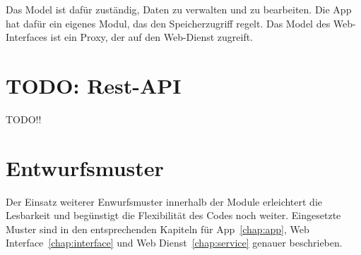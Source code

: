 Das Model ist dafür zuständig, Daten zu verwalten und zu bearbeiten. Die App hat dafür ein eigenes Modul, das den Speicherzugriff regelt. Das Model des Web-Interfaces ist ein Proxy, der auf den Web-Dienst zugreift.\newline\par

\section{TODO: Rest-API} \label{allg:Rest}
TODO!!

\section{Entwurfsmuster} \label{allg:Entwurfsmuster}
Der Einsatz weiterer Enwurfsmuster innerhalb der Module erleichtert die Lesbarkeit und begünstigt die Flexibilität des Codes noch weiter. Eingesetzte Muster sind in den entsprechenden Kapiteln für App~\eqref{chap:app}, Web Interface~\eqref{chap:interface} und Web Dienst~\eqref{chap:service} genauer beschrieben.